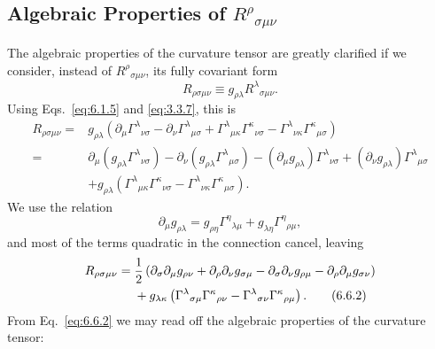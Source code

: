
\subsection[Algebraic Properties of the Riemann Tensor]
{Algebraic Properties of \(R^\rho{}_{\sigma\mu\nu}\)}\label{sec:6.6}

The algebraic properties of the curvature tensor are greatly clarified if we
consider, instead of \(R^\rho{}_{\sigma\mu\nu}\), its fully covariant form
\begin{equation}
  R_{\rho\sigma\mu\nu}
  \equiv
  g_{\rho\lambda}R^\lambda{}_{\sigma\mu\nu}.
  \tag{6.6.1}\label{eq:6.6.1}
\end{equation}
Using Eqs.~\eqref{eq:6.1.5} and \eqref{eq:3.3.7}, this is
\begin{align*}
  R_{\rho\sigma\mu\nu}
  ={}&
  g_{\rho\lambda}
  \left(
    \partial_\mu\Gamma^\lambda{}_{\nu\sigma}
    -\partial_\nu\Gamma^\lambda{}_{\mu\sigma}
    +\Gamma^\lambda{}_{\mu\kappa}\Gamma^\kappa{}_{\nu\sigma}
    -\Gamma^\lambda{}_{\nu\kappa}\Gamma^\kappa{}_{\mu\sigma}
  \right)
  \\
  ={}&
  \partial_\mu(g_{\rho\lambda}\Gamma^\lambda{}_{\nu\sigma})
  -\partial_\nu(g_{\rho\lambda}\Gamma^\lambda{}_{\mu\sigma})
  -(\partial_\mu g_{\rho\lambda})\Gamma^\lambda{}_{\nu\sigma}
  +(\partial_\nu g_{\rho\lambda})\Gamma^\lambda{}_{\mu\sigma}
  \\
  &+
  g_{\rho\lambda}
  \left(
    \Gamma^\lambda{}_{\mu\kappa}\Gamma^\kappa{}_{\nu\sigma}
    -\Gamma^\lambda{}_{\nu\kappa}\Gamma^\kappa{}_{\mu\sigma}
  \right).
\end{align*}
We use the relation
\[
  \partial_\mu g_{\rho\lambda}
  =
  g_{\rho\eta}\Gamma^\eta{}_{\lambda\mu}
  +g_{\lambda\eta}\Gamma^\eta{}_{\rho\mu},
\]
and most of the terms quadratic in the connection cancel, leaving
\begin{align}
  R_{\rho\sigma\mu\nu}
  ={}&
  \frac12
  \left(
    \partial_\sigma\partial_\mu g_{\rho\nu}
    +\partial_\rho\partial_\nu g_{\sigma\mu}
    -\partial_\sigma\partial_\nu g_{\rho\mu}
    -\partial_\rho\partial_\mu g_{\sigma\nu}
  \right)
  \notag\\
  &+
  g_{\lambda\kappa}
  \left(
    \Gamma^\lambda{}_{\sigma\mu}\Gamma^\kappa{}_{\rho\nu}
    -\Gamma^\lambda{}_{\sigma\nu}\Gamma^\kappa{}_{\rho\mu}
  \right).
  \tag{6.6.2}\label{eq:6.6.2}
\end{align}
From Eq.~\eqref{eq:6.6.2} we may read off the algebraic properties of the
curvature tensor:

